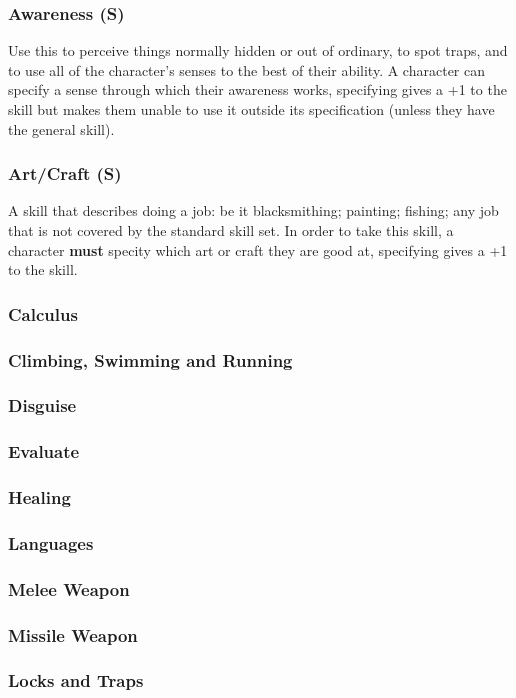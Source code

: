 \subsubsection*{Awareness (S)}
Use this to perceive things normally hidden or out of ordinary, to spot traps, and to use all of the character's senses to the best of their ability. A character can specify a sense through which their awareness works, specifying gives a +1 to the skill but makes them unable to use it outside its specification (unless they have the general skill).
\subsubsection*{Art/Craft (S)}
A skill that describes doing a job: be it blacksmithing; painting; fishing; any job that is not covered by the standard skill set. In order to take this skill, a character \textbf{must} specity which art or craft they are good at, specifying gives a +1 to the skill.
\subsubsection*{Calculus}

\subsubsection*{Climbing, Swimming and Running}
\subsubsection*{Disguise}
\subsubsection*{Evaluate}
\subsubsection*{Healing}
\subsubsection*{Languages}
\subsubsection*{Melee Weapon}
\subsubsection*{Missile Weapon}
\subsubsection*{Locks and Traps}

